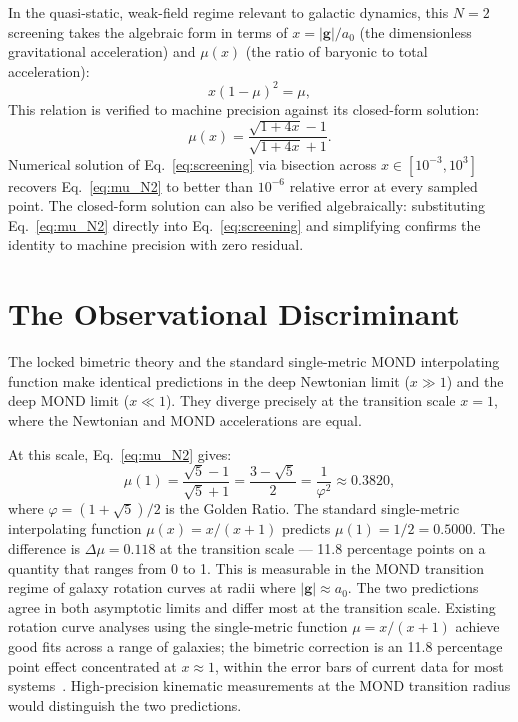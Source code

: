 \documentclass[a4paper,11pt]{article}
\begin{document}
In the quasi-static, weak-field regime relevant to galactic
dynamics, this $N = 2$ screening takes the algebraic form
in terms of $x = |\mathbf{g}|/a_0$ (the dimensionless
gravitational acceleration) and $\mu(x)$ (the ratio of
baryonic to total acceleration):
\begin{equation}
  x(1 - \mu)^2 = \mu,
  \label{eq:screening}
\end{equation}
This relation is
verified to machine precision against its closed-form
solution:
\begin{equation}
  \mu(x) = \frac{\sqrt{1+4x} - 1}{\sqrt{1+4x} + 1}.
  \label{eq:mu_N2}
\end{equation}
Numerical solution of Eq.~\eqref{eq:screening} via
bisection across $x \in [10^{-3}, 10^3]$ recovers
Eq.~\eqref{eq:mu_N2} to better than $10^{-6}$ relative
error at every sampled point. The closed-form solution
can also be verified algebraically: substituting
Eq.~\eqref{eq:mu_N2} directly into
Eq.~\eqref{eq:screening} and simplifying confirms the
identity to machine precision with zero residual.

\section{The Observational Discriminant}

The locked bimetric theory and the standard single-metric
MOND interpolating function make identical predictions in
the deep Newtonian limit ($x \gg 1$) and the deep MOND
limit ($x \ll 1$). They diverge precisely at the
transition scale $x = 1$, where the Newtonian and MOND
accelerations are equal.

At this scale, Eq.~\eqref{eq:mu_N2} gives:
\begin{equation}
  \mu(1) = \frac{\sqrt{5} - 1}{\sqrt{5} + 1}
  = \frac{3 - \sqrt{5}}{2} = \frac{1}{\varphi^2}
  \approx 0.3820,
\end{equation}
where $\varphi = (1+\sqrt{5})/2$ is the Golden Ratio.
The standard single-metric interpolating function
$\mu(x) = x/(x+1)$ predicts $\mu(1) = 1/2 = 0.5000$.
The difference is $\Delta\mu = 0.118$ at the transition
scale --- 11.8 percentage points on a quantity that ranges
from 0 to 1. This is measurable
in the MOND transition regime of galaxy rotation curves
at radii where $|\mathbf{g}| \approx a_0$.
The two predictions agree in both asymptotic limits and
differ most at the transition scale. Existing rotation
curve analyses using the single-metric function
$\mu = x/(x+1)$ achieve good fits across a range of
galaxies; the bimetric correction is an 11.8 percentage
point effect concentrated at $x \approx 1$, within the
error bars of current data for most systems~\cite{Nelson2026_MNRAS}.
High-precision kinematic measurements at the MOND
transition radius would distinguish the two predictions.
\end{document}
